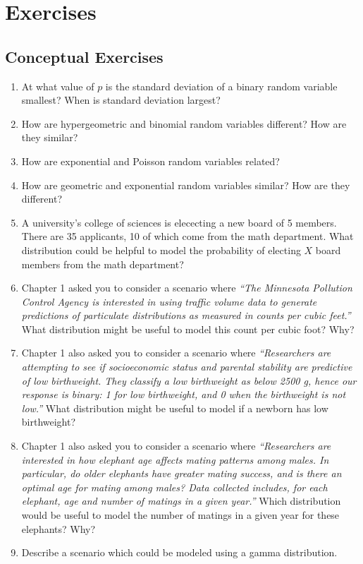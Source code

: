 \documentclass[
]{krantz}
\begin{document}
\hypertarget{exercises-2}{%
\section{Exercises}\label{exercises-2}}

\hypertarget{conceptual-exercises-2}{%
\subsection{Conceptual Exercises}\label{conceptual-exercises-2}}

\begin{enumerate}
\def\labelenumi{\arabic{enumi}.}
\item
  At what value of \(p\) is the standard deviation of a binary random variable smallest? When is standard deviation largest?
\item
  How are hypergeometric and binomial random variables different? How are they similar?
\item
  How are exponential and Poisson random variables related?
\item
  How are geometric and exponential random variables similar? How are they different?
\item
  A university's college of sciences is elececting a new board of 5 members. There are 35 applicants, 10 of which come from the math department. What distribution could be helpful to model the probability of electing \(X\) board members from the math department?
\item
  Chapter 1 asked you to consider a scenario where \emph{``The Minnesota Pollution Control Agency is interested in using traffic volume data to generate predictions of particulate distributions as measured in counts per cubic feet.''} What distribution might be useful to model this count per cubic foot? Why?
\item
  Chapter 1 also asked you to consider a scenario where \emph{``Researchers are attempting to see if socioeconomic status and parental stability are predictive of low birthweight. They classify a low birthweight as below 2500 g, hence our response is binary: 1 for low birthweight, and 0 when the birthweight is not low.''} What distribution might be useful to model if a newborn has low birthweight?
\item
  Chapter 1 also asked you to consider a scenario where \emph{``Researchers are interested in how elephant age affects mating patterns among males. In particular, do older elephants have greater mating success, and is there an optimal age for mating among males? Data collected includes, for each elephant, age and number of matings in a given year.''} Which distribution would be useful to model the number of matings in a given year for these elephants? Why?
\item
  Describe a scenario which could be modeled using a gamma distribution.
\end{enumerate}
\end{document}
